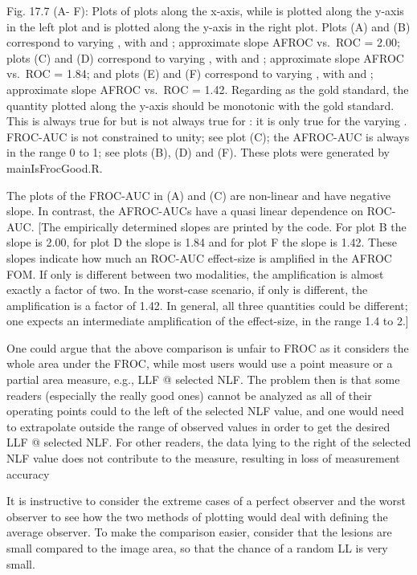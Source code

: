 \documentclass[
]{book}
\begin{document}
Fig. 17.7 (A- F): Plots of plots along the x-axis, while is plotted along the y-axis in the left plot and is plotted along the y-axis in the right plot. Plots (A) and (B) correspond to varying , with and ; approximate slope AFROC vs.~ROC = 2.00; plots (C) and (D) correspond to varying , with and ; approximate slope AFROC vs.~ROC = 1.84; and plots (E) and (F) correspond to varying , with and ; approximate slope AFROC vs.~ROC = 1.42. Regarding as the gold standard, the quantity plotted along the y-axis should be monotonic with the gold standard. This is always true for but is not always true for : it is only true for the varying . FROC-AUC is not constrained to unity; see plot (C); the AFROC-AUC is always in the range 0 to 1; see plots (B), (D) and (F). These plots were generated by mainIsFrocGood.R.

The plots of the FROC-AUC in (A) and (C) are non-linear and have negative slope. In contrast, the AFROC-AUCs have a quasi linear dependence on ROC-AUC. {[}The empirically determined slopes are printed by the code. For plot B the slope is 2.00, for plot D the slope is 1.84 and for plot F the slope is 1.42. These slopes indicate how much an ROC-AUC effect-size is amplified in the AFROC FOM. If only is different between two modalities, the amplification is almost exactly a factor of two. In the worst-case scenario, if only is different, the amplification is a factor of 1.42. In general, all three quantities could be different; one expects an intermediate amplification of the effect-size, in the range 1.4 to 2.{]}

One could argue that the above comparison is unfair to FROC as it considers the whole area under the FROC, while most users would use a point measure or a partial area measure, e.g., LLF @ selected NLF. The problem then is that some readers (especially the really good ones) cannot be analyzed as all of their operating points could to the left of the selected NLF value, and one would need to extrapolate outside the range of observed values in order to get the desired LLF @ selected NLF. For other readers, the data lying to the right of the selected NLF value does not contribute to the measure, resulting in loss of measurement accuracy

It is instructive to consider the extreme cases of a perfect observer and the worst observer to see how the two methods of plotting would deal with defining the average observer. To make the comparison easier, consider that the lesions are small compared to the image area, so that the chance of a random LL is very small.
\end{document}
